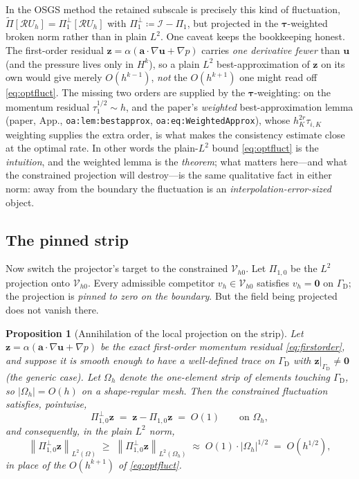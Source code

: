 \documentclass[11pt]{article}
\newcommand{\bu}{\boldsymbol{u}}
\newcommand{\ba}{\boldsymbol{a}}
\newcommand{\bz}{\boldsymbol{z}}
\newcommand{\bzero}{\boldsymbol{0}}
\newcommand{\grad}{\nabla}
\newcommand{\norm}[1]{\left\lVert #1 \right\rVert}
\newcommand{\Rop}{\mathcal{R}}
\newcommand{\Vhz}{\mathcal{V}_{h0}}
\newcommand{\Pone}{\Pi_{1}}
\newcommand{\Ponez}{\Pi_{1,0}}
\newcommand{\Poneperp}{\Pi_{1}^{\perp}}
\newcommand{\Ptilde}{\widetilde{\Pi}}
\theoremstyle{plain}
\newtheorem{proposition}{Proposition}
\theoremstyle{definition}
\theoremstyle{remark}
\begin{document}
In the OSGS method the retained subscale is precisely this kind of
fluctuation, $\Ptilde[\Rop U_h]=\Poneperp[\Rop U_h]$ with
$\Poneperp\coloneqq\mathcal I-\Pone$, but projected in the
$\bm\tau$-weighted broken norm rather than in plain $L^2$. One caveat
keeps the bookkeeping honest. The first-order residual
$\bz=\alpha(\ba\cdot\grad\bu+\grad p)$ carries \emph{one derivative
fewer} than $\bu$ (and the pressure lives only in $H^{k}$), so a plain
$L^2$ best-approximation of $\bz$ on its own would give merely
$O(h^{k-1})$, \emph{not} the $O(h^{k+1})$ one might read off
\cref{eq:optfluct}. The missing two orders are supplied by the
$\bm\tau$-weighting: on the momentum residual $\tau_1^{1/2}\sim h$, and
the paper's \emph{weighted} best-approximation lemma (paper, App.,
\texttt{oa:lem:bestapprox}, \texttt{oa:eq:WeightedApprox}), whose
$h_K^{2r}\tau_{i,K}$ weighting supplies the extra order, is what makes
the consistency estimate close at the optimal rate. In other words the
plain-$L^2$ bound \cref{eq:optfluct} is the \emph{intuition}, and the
weighted lemma is the \emph{theorem}; what matters here---and what the
constrained projection will destroy---is the same qualitative fact in
either norm: away from the boundary the fluctuation is an
\emph{interpolation-error-sized} object.

\subsection{The pinned strip}

Now switch the projector's target to the constrained $\Vhz$. Let
$\Ponez$ be the $L^2$ projection onto $\Vhz$. Every admissible
competitor $v_h\in\Vhz$ satisfies $v_h=\bzero$ on $\Gamma_{\mathrm D}$;
the projection is \emph{pinned to zero on the boundary}. But the field
being projected does not vanish there.

\begin{proposition}[Annihilation of the local projection on the strip]
\label{prop:strip}
Let $\bz=\alpha(\ba\cdot\grad\bu+\grad p)$ be the exact first-order
momentum residual \cref{eq:firstorder}, and suppose it is smooth enough
to have a well-defined trace on $\Gamma_{\mathrm D}$ with
$\bz|_{\Gamma_{\mathrm D}}\neq\bzero$ (the generic case). Let $\Omega_h$
denote the one-element strip of elements touching $\Gamma_{\mathrm D}$,
so $\lvert\Omega_h\rvert = O(h)$ on a shape-regular mesh. Then the
constrained fluctuation satisfies, pointwise,
\[
  \Ponez^{\perp}\bz \;=\; \bz-\Ponez\bz \;=\; O(1)
  \qquad\text{on }\Omega_h,
\]
and consequently, in the plain $L^2$ norm,
\begin{equation}\label{eq:half}
  \norm{\Ponez^{\perp}\bz}_{L^2(\Omega)}
  \;\ge\;\norm{\Ponez^{\perp}\bz}_{L^2(\Omega_h)}
  \;\approx\; O(1)\cdot\lvert\Omega_h\rvert^{1/2}
  \;=\; O(h^{1/2}),
\end{equation}
in place of the $O(h^{k+1})$ of \cref{eq:optfluct}.
\end{proposition}
\end{document}
